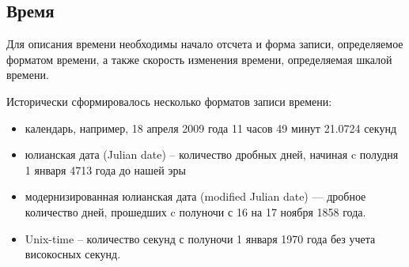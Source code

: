 \subsection{Время}
 Для описания времени необходимы начало отсчета и форма записи, определяемое форматом времени, 
 а также скорость изменения времени, определяемая шкалой времени.

Исторически сформировалось несколько форматов записи времени:
\begin{itemize}
    \item календарь, например, 18 апреля 2009 года 11 часов 49 минут
    21.0724 секунд
    \item юлианская дата (Julian date) -- количество дробных дней, начиная c полудня 1 января
    4713 года до нашей эры
    \item модернизированная юлианская дата (modified Julian date) —
    дробное количество дней, прошедших c полуночи с 16 на 17 ноября 1858 года.
    \item Unix-time -- количество секунд с полуночи 1 января 1970 года без
    учета високосных секунд.
\end{itemize}

